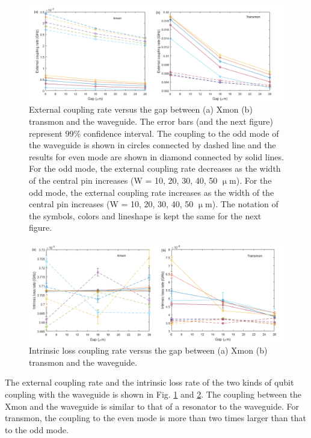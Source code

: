 \documentclass[noshowpacs,amsmath,
superscriptaddress,
10pt]{article}
\begin{document}
\begin{figure}[!ht]
\centering
\includegraphics[width=16cm] {ke_Xmon}
\caption{External coupling rate versus the gap between (a) Xmon (b) transmon and the waveguide. The error bars (and the next figure) represent 99\% confidence interval. The coupling to the odd mode of the waveguide is shown in circles connected by dashed line and the results for even mode are shown in diamond connected by solid lines. For the odd mode, the external coupling rate decreases as the width of the central pin increases (W = 10, 20, 30, 40, 50 $\upmu$m). For the odd mode, the external coupling rate increases as the width of the central pin increases (W = 10, 20, 30, 40, 50 $\upmu$m). The notation of the symbols, colors and lineshape is kept the same for the next figure.}
\label{pic:ke_Xmon}
\end{figure}

\begin{figure}[!ht]
\centering
\includegraphics[width=16cm] {ki_Xmon}
\caption{Intrinsic loss coupling rate versus the gap between (a) Xmon (b) transmon and the waveguide.}
\label{pic:ki_Xmon}
\end{figure}

The external coupling rate and the intrinsic loss rate of the two kinds of qubit coupling with the waveguide is shown in Fig. \ref{pic:ke_Xmon} and \ref{pic:ki_Xmon}. The coupling between the Xmon and the waveguide is similar to that of a resonator to the waveguide. For transmon, the coupling to the even mode is more than two times larger than that to the odd mode. 




\end{document}
